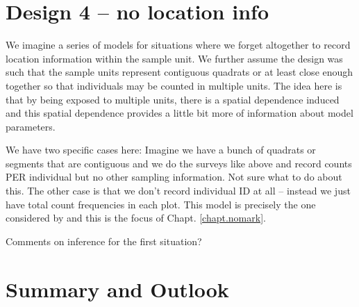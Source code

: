 \section{Design 4 -- no location info }

We imagine a series of models for situations where we forget
altogether to record location information within the sample unit. We
further assume the design was such that the sample units represent
contiguous quadrats or at least close enough together so that
individuals may be counted in multiple units. The idea here is that by
being exposed to multiple units, there is a spatial dependence induced
and this spatial dependence provides a little bit more of information
about model parameters. 

We have two specific cases here:
Imagine we have a bunch of quadrats or segments that are contiguous
and we do the surveys like above and record counts PER individual  but
no other sampling information.  Not sure what to do about this.
The other case is that we don't record individual ID at all -- instead
we just have total count frequencies in each plot. 
This model is precisely the one considered by
\citep{chandler_royle:2012} and this is the focus of Chapt. \ref{chapt.nomark}.

Comments on inference for the first situation?




\section{Summary and Outlook}



